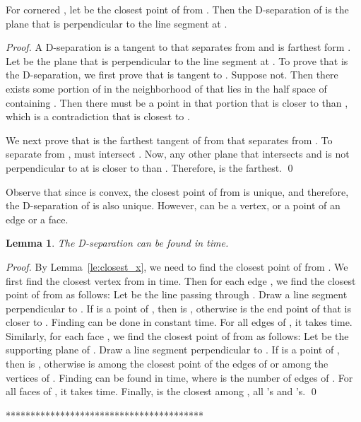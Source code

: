 \documentclass{llncs}
\newtheorem{lem}{Lemma}
\begin{document}
\begin{lemma}
\label{le:closest_x}
For cornered , let  be the closest point of  from .
Then the D-separation of  is the plane that is perpendicular to the line segment  at .
\end{lemma}

\begin{proof}
A D-separation is a tangent to  that separates  from  and is farthest form .
Let  be the plane that is perpendicular to the line segment  at .
To prove that  is the D-separation, we first prove that  is tangent to .
Suppose not. 
Then there exists some portion of  in the neighborhood of  that lies in the half space of  containing .
Then there must be a point  in that portion that is closer to  than ,
which is a contradiction that  is closest to .

We next prove that  is the farthest tangent of  from  that separates  from .
To separate  from ,  must intersect .
Now, any other plane that intersects  and is not perpendicular to  at 
is closer to  than .
Therefore,  is the farthest.
\qed
\end{proof}

Observe that since  is convex, the  closest point  of  from  is unique,
and therefore, the D-separation of  is also unique.
However,  can be a vertex, or a point of an edge or a face.

\begin{lem}
The D-separation can be found in  time.
\end{lem}

\begin{proof}
By Lemma~\ref{le:closest_x}, we need to find the closest point  of  from .
We first find the closest vertex  from  in  time.
Then for each edge , we find the closest point  of  from  as follows:
Let  be the line passing through .
Draw a line segment  perpendicular to .
If  is a point of , then  is ,
otherwise  is the end point of  that is closer to .
Finding  can be done in constant time. 
For all edges of , it takes  time.
Similarly, for each face , we find the closest point  of  from  as follows:
Let  be the supporting plane of .
Draw a line segment  perpendicular to .
If  is a point of , then  is ,
otherwise  is among the closest point of the edges of  or among the vertices of .
Finding  can be found in  time, where  is the number of edges of .
For all faces of , it takes  time.
Finally,  is the closest among , all 's and 's.
\qed
\end{proof}

\iffalse*****************************************
\end{document}
